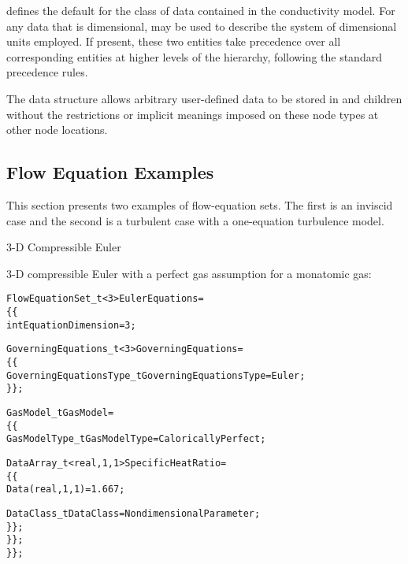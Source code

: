  defines the default for the class of data contained in
the conductivity model.
For any data that is dimensional,  may be used to
describe the system of dimensional units employed.
If present, these two entities take precedence over all corresponding
entities at higher levels of the hierarchy, following the standard
precedence rules.

The  data structure allows arbitrary
user-defined data to be stored in  and
 children without the restrictions or implicit
meanings imposed on these node types at other node locations.

\subsection{ Flow Equation Examples}
\label{s:flowexample}

This section presents two examples of flow-equation sets.  The first is
an inviscid case and the second is a turbulent case with a one-equation
turbulence model.

\begin{example}{3-D Compressible Euler}
\label{e:eqn_Euler}

3-D compressible Euler with a perfect gas assumption for a monatomic gas:
\begin{alltt}
  FlowEquationSet\_t<3> EulerEquations = 
    \{\{
    int EquationDimension = 3 ;
    
    GoverningEquations\_t<3> GoverningEquations =
      \{\{
      GoverningEquationsType\_t GoverningEquationsType = Euler ;
      \}\} ;
      
    GasModel\_t GasModel =
      \{\{
      GasModelType\_t GasModelType = CaloricallyPerfect ;
      
      DataArray\_t<real, 1, 1> SpecificHeatRatio =
        \{\{
        Data(real, 1, 1) = 1.667 ;

        DataClass\_t DataClass = NondimensionalParameter ;
        \}\} ;
      \}\} ;
    \}\} ;
\end{alltt}
\end{example}

